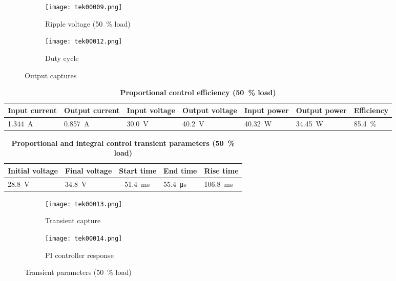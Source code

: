 \begin{figure}[H]
    \begin{subfigure}{0.5\textwidth}
        \texttt{[image: tek00009.png]}
        \caption{Ripple voltage (\qty{50}{\percent} load)}
    \end{subfigure}
    \hfill
    \begin{subfigure}{0.5\textwidth}
        \texttt{[image: tek00012.png]}
        \caption{Duty cycle}
        \label{fig:prop50dutycycle}
    \end{subfigure}
    \caption{Output captures}
\end{figure}

\begin{table}[H]
    \centering
    \caption{\textbf{Proportional control efficiency (\qty{50}{\percent} load)}}
    \begin{tabularx}{\columnwidth}{|X|X|X|X|X|X|X|}
        \hline
        Input current        & Output current       & Input voltage  & Output voltage & Input power        & Output power       & Efficiency           \\
        \hline
        \qty{1.344}{\ampere} & \qty{0.857}{\ampere} & \qty{30.0}{\V} & \qty{40.2}{\V} & \qty{40.32}{\watt} & \qty{34.45}{\watt} & \qty{85.4}{\percent} \\
        \hline
    \end{tabularx}
\end{table}

\clearpage
\begin{table}[H]
    \centering
    \caption{\textbf{Proportional and integral control transient parameters (\qty{50}{\percent} load)}}
    \begin{tabularx}{\columnwidth}{|X|X|X|X|X|}
        \hline
        Initial voltage   & Final voltage     & Start time       & End time        & Rise time        \\
        \hline
        \qty{28.8}{\volt} & \qty{34.8}{\volt} & \qty{-51.4}{\ms} & \qty{55.4}{\us} & \qty{106.8}{\ms} \\
        \hline
    \end{tabularx}
\end{table}
\begin{figure}[H]
    \begin{subfigure}{0.5\textwidth}
        \texttt{[image: tek00013.png]}
        \caption{Transient capture}
        \label{fig:pi50trans}
    \end{subfigure}
    \hfill
    \begin{subfigure}{0.5\textwidth}
        \texttt{[image: tek00014.png]}
        \caption{PI controller response}
        \label{fig:pi50controller}
    \end{subfigure}
    \caption{Transient parameters (\qty{50}{\percent} load)}
\end{figure}

